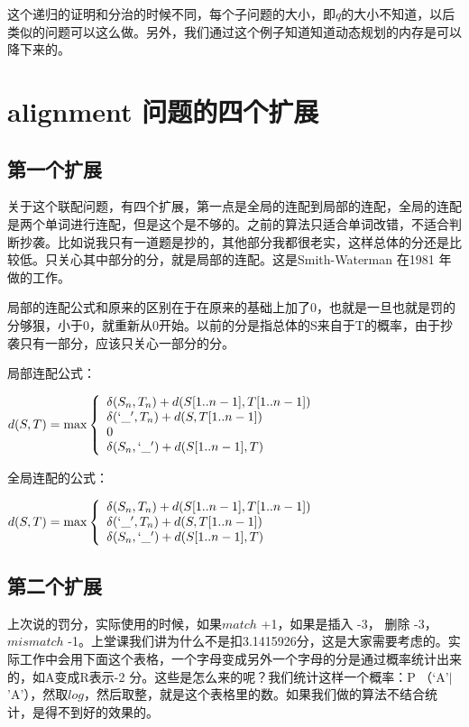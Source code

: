 这个递归的证明和分治的时候不同，每个子问题的大小，即$q$的大小不知道，以后类似的问题可以这么做。另外，我们通过这个例子知道知道动态规划的内存是可以降下来的。

\section{alignment 问题的四个扩展}
\subsection{第一个扩展}
关于这个联配问题，有四个扩展，第一点是全局的连配到局部的连配，全局的连配是两个单词进行连配，但是这个是不够的。之前的算法只适合单词改错，不适合判断抄袭。比如说我只有一道题是抄的，其他部分我都很老实，这样总体的分还是比较低。只关心其中部分的分，就是局部的连配。这是Smith-Waterman 在1981 年做的工作。

局部的连配公式和原来的区别在于在原来的基础上加了0，也就是一旦也就是罚的分够狠，小于0，就重新从0开始。以前的分是指总体的S来自于T的概率，由于抄袭只有一部分，应该只关心一部分的分。

局部连配公式：

$d( S, T) = \max  \left \{ \begin{array}{ll}  \delta(S_n, T_n) + d(S[1..n-1], T[1..n-1]) &  \\
  \delta(`\_', T_n) + d(S, T[1..n-1]) & \\
  0 &\\
 \delta(S_n,`\_') + d(S[1..n-1],T) &  \end{array}
 \right. $

全局连配的公式：

$d( S, T) = \max  \left \{ \begin{array}{ll}  \delta(S_n, T_n) + d(S[1..n-1], T[1..n-1]) &  \\
  \delta(`\_', T_n) + d(S, T[1..n-1]) & \\
 \delta(S_n,`\_') + d(S[1..n-1],T) &  \end{array}
 \right. $

\subsection{第二个扩展}
上次说的罚分，实际使用的时候，如果$match$ +1，如果是插入 -3， 删除 -3，$mismatch$ -1。上堂课我们讲为什么不是扣3.1415926分，这是大家需要考虑的。实际工作中会用下面这个表格，一个字母变成另外一个字母的分是通过概率统计出来的，如A变成R表示-2 分。这些是怎么来的呢？我们统计这样一个概率：P （‘A’$|$'A'），然取$log$，然后取整，就是这个表格里的数。如果我们做的算法不结合统计，是得不到好的效果的。


